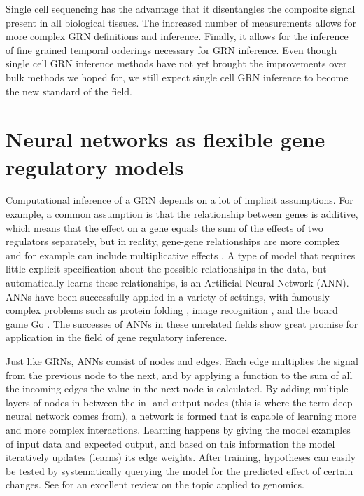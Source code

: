 Single cell sequencing has the advantage that it disentangles the composite signal present in all biological tissues. The increased number of measurements allows for more complex GRN definitions and inference. Finally, it allows for the inference of fine grained temporal orderings necessary for GRN inference. Even though single cell GRN inference methods have not yet brought the improvements over bulk methods we hoped for, we still expect single cell GRN inference to become the new standard of the field.

\section{Neural networks as flexible gene regulatory models}

Computational inference of a GRN depends on a lot of implicit assumptions. For example, a common assumption is that the relationship between genes is additive, which means that the effect on a gene equals the sum of the effects of two regulators separately, but in reality, gene-gene relationships are more complex and for example can include multiplicative effects \cite{Kim_2021}. A type of model that requires little explicit specification about the possible relationships in the data, but automatically learns these relationships, is an Artificial Neural Network (ANN). ANNs have been successfully applied in a variety of settings, with famously complex problems such as protein folding \cite{Jumper_2021}, image recognition \cite{Krizhevsky2017}, and the board game Go \cite{Silver_2016}. The successes of ANNs in these unrelated fields show great promise for application in the field of gene regulatory inference.

Just like GRNs, ANNs consist of nodes and edges. Each edge multiplies the signal from the previous node to the next, and by applying a function to the sum of all the incoming edges the value in the next node is calculated. By adding multiple layers of nodes in between the in- and output nodes (this is where the term deep neural network comes from), a network is formed that is capable of learning more and more complex interactions. Learning happens by giving the model examples of input data and expected output, and based on this information the model iteratively updates (learns) its edge weights. After training, hypotheses can easily be tested by systematically querying the model for the predicted effect of certain changes. See \cite{Eraslan_2019} for an excellent review on the topic applied to genomics.

